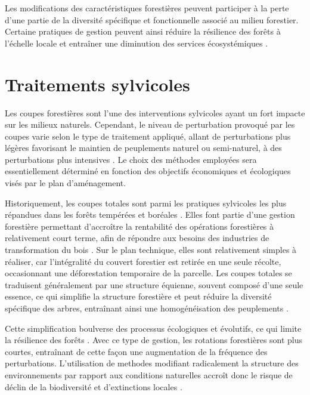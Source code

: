 Les modifications des caractéristiques forestières peuvent participer à la perte d'une partie de la diversité spécifique et fonctionnelle associé au milieu forestier. 
Certaine pratiques de gestion peuvent ainsi réduire la résilience des forêts à l'échelle locale et entraîner une diminution des services écosystémiques \citep{Hooper2012globalsynthesis,Edwards2014Maintainingecosystem}. 


\section*{Traitements sylvicoles}
\label{sec:sylvicole}

Les coupes forestières sont l'une des interventions sylvicoles ayant un fort impacte sur les milieux naturels. 
Cependant, le niveau de perturbation provoqué par les coupes varie selon le type de traitement appliqué, allant de perturbations plus légères favorisant le maintien de peuplements naturel ou semi-naturel, à des perturbations plus intensives \citep{Ameray2021Forestcarbon}. 
Le choix des méthodes employées sera essentiellement déterminé en fonction des objectifs économiques et écologiques visés par le plan d'aménagement.

Historiquement, les coupes totales sont parmi les pratiques sylvicoles les plus répandues dans les forêts tempérées et boréales \citep{Fedrowitz2014Canretention,Chaudhary2016Impactforest}. 
Elles font partie d’une gestion forestière permettant d’accroître la rentabilité des opérations forestières à relativement court terme, afin de répondre aux besoins des industries de transformation du bois \citep{Irland2011TimberProductivitya}. 
Sur le plan technique, elles sont relativement simples à réaliser, car l'intégralité du couvert forestier est retirée en une seule récolte, occasionnant une déforestation temporaire de la parcelle. 
Les coupes totales se traduisent généralement par une structure équienne, souvent composé d'une seule essence, ce qui simplifie la structure forestière et peut réduire la diversité spécifique des arbres, entraînant ainsi une homogénéisation des peuplements \citep{Brashears2004AssessmentCanopy,Martin2020Forestmanagement}. 

Cette simplification boulverse des processus écologiques et évolutifs, ce qui limite la résilience des forêts \citep{Holling2001UnderstandingComplexity}. 
Avec ce type de gestion, les rotations forestières sont plus courtes, entraînant de cette façon une augmentation de la fréquence des perturbations. 
L’utilisation de methodes modifiant radicalement la structure des environnements par rapport aux conditions naturelles accroît donc le risque de déclin de la biodiversité et d’extinctions locales \citep{Hanski2000Extinctiondebt}. 

